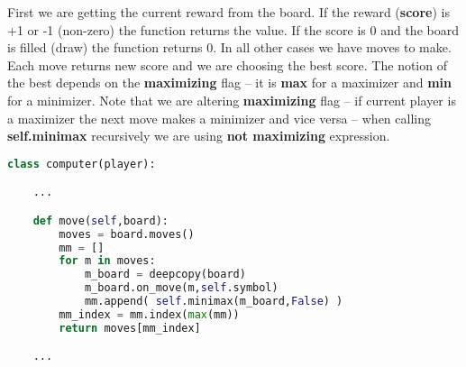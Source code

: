 First we are getting the current reward
from the board. If the reward (\textbf{score}) is +1 or -1 (non-zero)
the function returns the value. 
If the score is 0 and the board is filled (draw) the function returns 0.
In all other cases we have moves to make. Each move returns new
score and we are choosing the best score. The notion of the best depends on
the \textbf{maximizing} flag -- it is \textbf{max} for a maximizer
and \textbf{min} for a minimizer.
Note that we are altering
\textbf{maximizing} flag -- if current player is a maximizer the next move
makes a minimizer and vice versa -- when calling \textbf{self.minimax}
recursively we are using \textbf{not maximizing} expression.

\begin{lstlisting}[language=Python,style=codelst2,caption={Tic-Tac-Toe: computer player, move funtion}]
class computer(player):

    ...

    def move(self,board):
        moves = board.moves()
        mm = []
        for m in moves:
            m_board = deepcopy(board)
            m_board.on_move(m,self.symbol)
            mm.append( self.minimax(m_board,False) )
        mm_index = mm.index(max(mm))
        return moves[mm_index]

    ...

\end{lstlisting}


